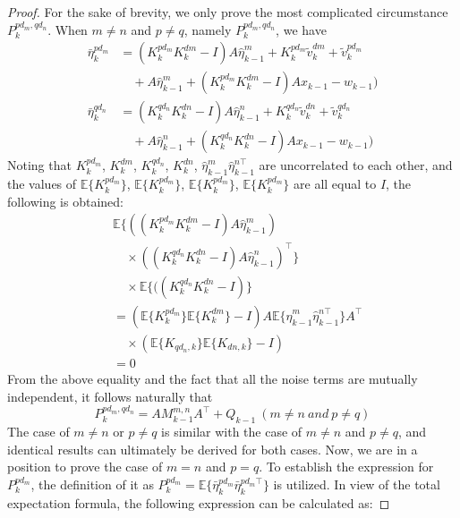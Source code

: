 \documentclass[twocolumn]{IEEEtran}
\begin{document}
\begin{proof}
For the sake of brevity, we only prove the most complicated circumstance $P^{pd_m,qd_n}_{k}$. When $m\neq n$ and $p\neq q$, namely $P_{k}^{pd_m,q
d_n}$, we have
\begin{equation*}
\begin{split}
\bar{\eta}_{k}^{pd_m}&=(K_{k}^{pd_m}K_{k}^{dm}-I)A\hat{\eta}_{k-1}^{m}+K_{k}^{pd_m}\tilde{v}_{k}^{dm}+\tilde{v}_{k}^{pd_m}\\
&\quad+A\hat{\eta}_{k-1}^{m}+(K_{k}^{pd_m}K_{k}^{dm}-I)Ax_{k-1}-w_{k-1})\\
\bar{\eta}_{k}^{qd_n}&=(K_{k}^{qd_n}K_{k}^{dn}-I)A\hat{\eta}_{k-1}^{n}+K_{k}^{qd_n}\tilde{v}_{k}^{dn}+\tilde{v}_{k}^{qd_n}\\
&\quad+A\hat{\eta}_{k-1}^{n}+(K_{k}^{qd_n}K_{k}^{dn}-I)Ax_{k-1}-w_{k-1})
\end{split}
\end{equation*}
Noting that $K_{k}^{pd_m}$, $K_{k}^{dm}$, $K_{k}^{qd_n}$, $K_{k}^{dn}$, $\hat{\eta}_{k-1}^{m}\hat{\eta}_{k-1}^{n\top}$ are uncorrelated to each other, and the values of $\mathbb{E}\{K_{k}^{pd_m}\}$, $\mathbb{E}\{K_{k}^{pd_m}\}$, $\mathbb{E}\{K_{k}^{pd_m}\}$, $\mathbb{E}\{K_{k}^{pd_m}\}$ are all equal to $I$, the following is obtained:
\begin{equation*}
\begin{split}
&\mathbb{E}\{((K_{k}^{pd_m}K_{k}^{dm}-I)A\hat{\eta}_{k-1}^{m})\\
&\quad\times((K_{k}^{qd_n}K_{k}^{dn}-I)A\hat{\eta}_{k-1}^{n})^\top\}\\
&\quad\times\mathbb{E}\{((K_{k}^{qd_n}K_{k}^{dn}-I)\}\\
&=(\mathbb{E}\{K_{k}^{pd_m}\}\mathbb{E}\{K_{k}^{dm}\}-I)A\mathbb{E}\{\hat{\eta}_{k-1}^{m}\hat{\eta}_{k-1}^{n\top} \}A^\top\\
&\quad\times(\mathbb{E}\{K_{qd_n,k}\}\mathbb{E}\{K_{dn,k}\}-I)\\
&=0
\end{split}
\end{equation*}
From the above equality and the fact that all the noise terms are mutually independent, it follows naturally that
\begin{equation*}
P^{pd_m,qd_n}_{k}=AM_{k-1}^{m,n}A^\top+Q_{k-1}~(m\neq n~ and~p\neq q )
\end{equation*}
The case of $m\neq n$ or $p\neq q$ is similar with the case of $m\neq n$ and $p\neq q$, and identical results can ultimately be derived for both cases. Now, we are in a position to prove the case of $m=n$ and $p=q$. To establish the expression for $P_{k}^{pd_m}$, the definition of it as $P_{k}^{pd_m}=\mathbb{E}\{\bar{\eta}_{k}^{pd_m}\bar{\eta}_{k}^{pd_m\top}\}$ is utilized. In view of the total expectation formula, the following expression can be calculated as:

\end{proof}
\end{document}

